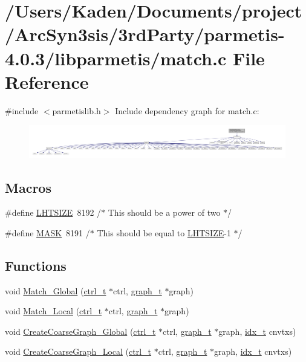 \hypertarget{a00368}{}\section{/\+Users/\+Kaden/\+Documents/project/\+Arc\+Syn3sis/3rd\+Party/parmetis-\/4.0.3/libparmetis/match.c File Reference}
\label{a00368}
{\ttfamily \#include $<$parmetislib.\+h$>$}\newline
Include dependency graph for match.\+c\+:\nopagebreak
\begin{figure}[H]
\begin{center}
\leavevmode
\includegraphics[width=350pt]{a00369}
\end{center}
\end{figure}
\subsection*{Macros}
\begin{DoxyCompactItemize}
\item 
\#define \hyperlink{a00368_a5beea06370d4f56022dd890e2a1ab444}{L\+H\+T\+S\+I\+ZE}~8192 /$\ast$ This should be a power of two $\ast$/
\item 
\#define \hyperlink{a00368_ae7520c5477c11965aabeedc033c9862b}{M\+A\+SK}~8191 /$\ast$ This should be equal to \hyperlink{a00368_a5beea06370d4f56022dd890e2a1ab444}{L\+H\+T\+S\+I\+ZE}-\/1 $\ast$/
\end{DoxyCompactItemize}
\subsection*{Functions}
\begin{DoxyCompactItemize}
\item 
void \hyperlink{a00368_ad37d00e4c0b7fb71a6778c5bf86d4d02}{Match\+\_\+\+Global} (\hyperlink{a00742}{ctrl\+\_\+t} $\ast$ctrl, \hyperlink{a00734}{graph\+\_\+t} $\ast$graph)
\item 
void \hyperlink{a00368_a46eecf02147d0406cc05ec7e3839169b}{Match\+\_\+\+Local} (\hyperlink{a00742}{ctrl\+\_\+t} $\ast$ctrl, \hyperlink{a00734}{graph\+\_\+t} $\ast$graph)
\item 
void \hyperlink{a00368_afe6fa9bdcdc3b227b06b992caf2aaec4}{Create\+Coarse\+Graph\+\_\+\+Global} (\hyperlink{a00742}{ctrl\+\_\+t} $\ast$ctrl, \hyperlink{a00734}{graph\+\_\+t} $\ast$graph, \hyperlink{a00876_aaa5262be3e700770163401acb0150f52}{idx\+\_\+t} cnvtxs)
\item 
void \hyperlink{a00368_a5070c68f093e9635e0f2bc1c8630ba27}{Create\+Coarse\+Graph\+\_\+\+Local} (\hyperlink{a00742}{ctrl\+\_\+t} $\ast$ctrl, \hyperlink{a00734}{graph\+\_\+t} $\ast$graph, \hyperlink{a00876_aaa5262be3e700770163401acb0150f52}{idx\+\_\+t} cnvtxs)
\end{DoxyCompactItemize}


